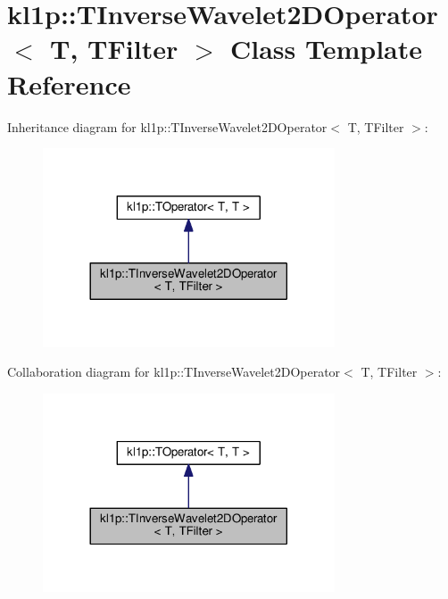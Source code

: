 \hypertarget{classkl1p_1_1TInverseWavelet2DOperator}{}\section{kl1p\+:\+:T\+Inverse\+Wavelet2\+D\+Operator$<$ T, T\+Filter $>$ Class Template Reference}
\label{classkl1p_1_1TInverseWavelet2DOperator}


Inheritance diagram for kl1p\+:\+:T\+Inverse\+Wavelet2\+D\+Operator$<$ T, T\+Filter $>$\+:
\nopagebreak
\begin{figure}[H]
\begin{center}
\leavevmode
\includegraphics[width=245pt]{classkl1p_1_1TInverseWavelet2DOperator__inherit__graph}
\end{center}
\end{figure}


Collaboration diagram for kl1p\+:\+:T\+Inverse\+Wavelet2\+D\+Operator$<$ T, T\+Filter $>$\+:
\nopagebreak
\begin{figure}[H]
\begin{center}
\leavevmode
\includegraphics[width=245pt]{classkl1p_1_1TInverseWavelet2DOperator__coll__graph}
\end{center}
\end{figure}
